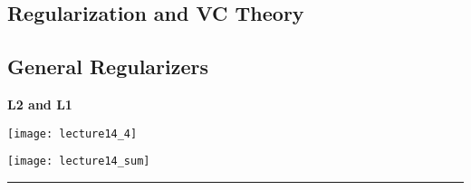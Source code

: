 \subsection{Regularization and VC Theory} %
\label{sub:regularization_and_vc_theory}

\subsection{General Regularizers} %
\label{sub:general_regularizers}
\textbf{\textcolor{mypink2}{L2 and L1}}
\begin{center}
\texttt{[image: lecture14\_4]}\\
\end{center}
\begin{center}
\texttt{[image: lecture14\_sum]}\\
\end{center}
\noindent
{\color{RubineRed} \rule{\linewidth}{1mm} }